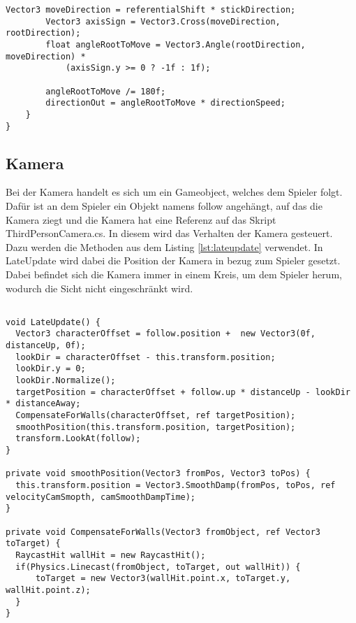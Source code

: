 \begin{scriptsize}
\begin{lstlisting}[label=lst:c_charactercontroller]
        Vector3 moveDirection = referentialShift * stickDirection;
        Vector3 axisSign = Vector3.Cross(moveDirection, rootDirection);
        float angleRootToMove = Vector3.Angle(rootDirection, moveDirection) * 
        	(axisSign.y >= 0 ? -1f : 1f);      
        	
        angleRootToMove /= 180f;
        directionOut = angleRootToMove * directionSpeed;
    }
}

\end{lstlisting}
\end{scriptsize}

\subsection{Kamera}
	Bei der Kamera handelt es sich um ein Gameobject, welches dem Spieler folgt. Dafür ist an dem Spieler ein Objekt namens follow angehängt, auf das die Kamera ziegt und die Kamera hat eine Referenz auf das Skript ThirdPersonCamera.cs. In diesem wird das Verhalten der Kamera gesteuert. Dazu werden die Methoden aus dem Listing \ref{lst:lateupdate} verwendet. In LateUpdate wird dabei die Position der Kamera in bezug zum Spieler gesetzt. Dabei befindet sich die Kamera immer in einem Kreis, um dem Spieler herum, wodurch die Sicht nicht eingeschränkt wird.

\begin{scriptsize}
\lstset{
	float,
	caption=Methode LateUpdate aus ThirdPersonCamera.cs, 
	language=[Sharp]C, 
	frame=single,  
	showstringspaces=false, 
	showspaces=false, 
	numbers=left, 
	captionpos=b, 
	belowcaptionskip=4pt,
	basicstyle=\ttfamily
} 
\begin{lstlisting}[label=lst:lateupdate]

void LateUpdate() {
  Vector3 characterOffset = follow.position +  new Vector3(0f, distanceUp, 0f);
  lookDir = characterOffset - this.transform.position;
  lookDir.y = 0;
  lookDir.Normalize();
  targetPosition = characterOffset + follow.up * distanceUp - lookDir * distanceAway;
  CompensateForWalls(characterOffset, ref targetPosition);
  smoothPosition(this.transform.position, targetPosition);
  transform.LookAt(follow);
}

private void smoothPosition(Vector3 fromPos, Vector3 toPos) {
  this.transform.position = Vector3.SmoothDamp(fromPos, toPos, ref velocityCamSmopth, camSmoothDampTime);
}

private void CompensateForWalls(Vector3 fromObject, ref Vector3 toTarget) {
  RaycastHit wallHit = new RaycastHit();
  if(Physics.Linecast(fromObject, toTarget, out wallHit)) {
      toTarget = new Vector3(wallHit.point.x, toTarget.y, wallHit.point.z);
  }
}

\end{lstlisting}
\end{scriptsize}

